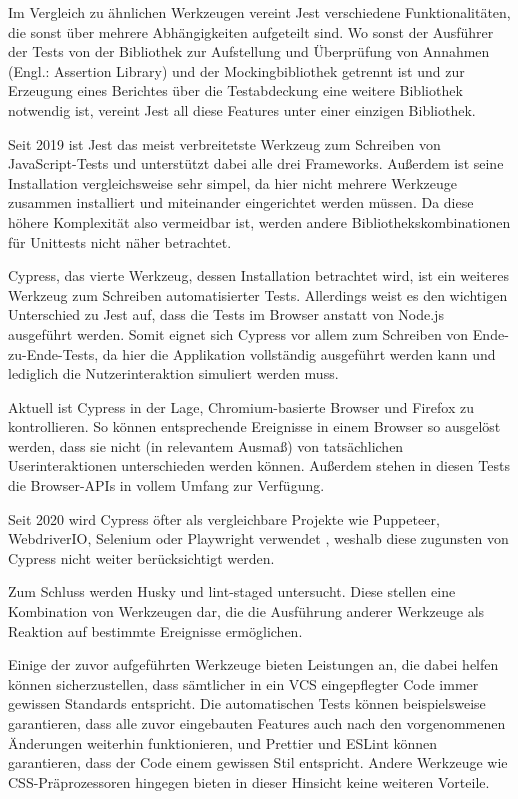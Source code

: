 Im Vergleich zu ähnlichen Werkzeugen vereint Jest verschiedene Funktionalitäten, die sonst über mehrere Abhängigkeiten aufgeteilt sind. Wo sonst der Ausführer der Tests von der Bibliothek zur Aufstellung und Überprüfung von Annahmen (Engl.: \glqq Assertion Library\grqq) und der Mockingbibliothek getrennt ist und zur Erzeugung eines Berichtes über die Testabdeckung eine weitere Bibliothek notwendig ist, vereint Jest all diese Features unter einer einzigen Bibliothek.

Seit 2019 ist Jest das meist verbreitetste Werkzeug zum Schreiben von JavaScript-Tests \cite{stateofjs} und unterstützt dabei alle drei Frameworks. Außerdem ist seine Installation vergleichsweise sehr simpel, da hier nicht mehrere Werkzeuge zusammen installiert und miteinander eingerichtet werden müssen. Da diese höhere Komplexität also vermeidbar ist, werden andere Bibliothekskombinationen für Unittests nicht näher betrachtet.

Cypress, das vierte Werkzeug, dessen Installation betrachtet wird, ist ein weiteres Werkzeug zum Schreiben automatisierter Tests. Allerdings weist es den wichtigen Unterschied zu Jest auf, dass die Tests im Browser anstatt von Node.js ausgeführt werden. Somit eignet sich Cypress vor allem zum Schreiben von Ende-zu-Ende-Tests, da hier die Applikation vollständig ausgeführt werden kann und lediglich die Nutzerinteraktion simuliert werden muss.

Aktuell ist Cypress in der Lage, Chromium-basierte Browser und Firefox zu kontrollieren. So können entsprechende Ereignisse in einem Browser so ausgelöst werden, dass sie nicht (in relevantem Ausmaß) von tatsächlichen Userinteraktionen unterschieden werden können. Außerdem stehen in diesen Tests die Browser-APIs in vollem Umfang zur Verfügung.

Seit 2020 wird Cypress öfter als vergleichbare Projekte wie Puppeteer, WebdriverIO, Selenium oder Playwright verwendet \cite{stateofjs}, weshalb diese zugunsten von Cypress nicht weiter berücksichtigt werden.

Zum Schluss werden Husky und lint-staged untersucht. Diese stellen eine Kombination von Werkzeugen dar, die die Ausführung anderer Werkzeuge als Reaktion auf bestimmte Ereignisse ermöglichen.

Einige der zuvor aufgeführten Werkzeuge bieten Leistungen an, die dabei helfen können sicherzustellen, dass sämtlicher in ein \gls{VCS} eingepflegter Code immer gewissen Standards entspricht. Die automatischen Tests können beispielsweise garantieren, dass alle zuvor eingebauten Features auch nach den vorgenommenen Änderungen weiterhin funktionieren, und Prettier und ESLint können garantieren, dass der Code einem gewissen Stil entspricht. Andere Werkzeuge wie CSS-Präprozessoren hingegen bieten in dieser Hinsicht keine weiteren Vorteile.

